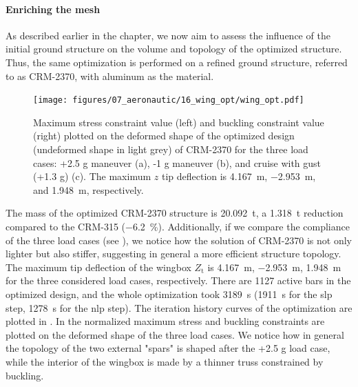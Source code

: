 \paragraph{Enriching the mesh}
As described earlier in the chapter, we now aim to assess the influence of the initial ground structure on the volume and topology of the optimized structure. Thus, the same optimization is performed on a refined ground structure, referred to as CRM-2370, with aluminum as the material.
\begin{figure}
    \centering
    \texttt{[image: figures/07\_aeronautic/16\_wing\_opt/wing\_opt.pdf]}
     \caption{Maximum stress constraint value (left) and buckling constraint value (right) plotted on the deformed shape of the optimized design (undeformed shape in light grey) of CRM-2370 for the three load cases: +2.5 g maneuver (a), -1 g maneuver (b), and cruise with gust (+1.3 g) (c). The maximum $z$ tip deflection is \qty{4.167}{m}, \qty{-2.953}{m}, and \qty{1.948}{m}, respectively.}
    \label{fig:07_wing_opt}
\end{figure}

The mass of the optimized CRM-2370 structure is \qty{20.092}{\tonne}, a \qty{1.318}{\tonne} reduction compared to the CRM-315 (\qty{-6.2}{\%}). Additionally, if we compare the compliance of the three load cases (see ), we notice how the solution of CRM-2370 is not only lighter but also stiffer, suggesting in general a more efficient structure topology. The maximum tip deflection of the wingbox $Z_\text{t}$ is \qty{4.167}{m}, \qty{-2.953}{m}, \qty{1.948}{m} for the three considered load cases, respectively. There are 1127 active bars in the optimized design, and the whole optimization took \qty{3189}{s} (\qty{1911}{s} for the \gls{slp} step, \qty{1278}{s} for the \gls{nlp} step). The iteration history curves of the optimization are plotted in . In  the normalized maximum stress and buckling constraints are plotted on the deformed shape of the three load cases. We notice how in general the topology of the two external "spars" is shaped after the +2.5 g load case, while the interior of the wingbox is made by a thinner truss constrained by buckling. 

